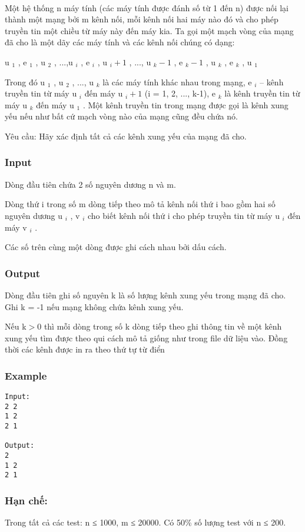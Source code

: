 

 

Một hệ thống n máy tính (các máy tính được đánh số từ 1 đến n) được nối lại thành một mạng bởi m kênh nối, mỗi kênh nối hai máy nào đó và cho phép truyền tin một chiều từ máy này đến máy kia. Ta gọi một mạch vòng của mạng đã cho là một dãy các máy tính và các kênh nối chúng có dạng:

u $_ 1 $ , e $_ 1 $ , u $_ 2 $ , ...,u $_ i $ , e $_ i $ , u $_ i+1 $ , ..., u $_ k-1 $ , e $_ k-1 $ , u $_ k $ , e $_ k $ , u $_ 1 $

Trong đó u $_ 1 $ , u $_ 2 $ , ..., u $_ k $ là các máy tính khác nhau trong mạng, e $_ i $ – kênh truyền tin từ máy u $_ i $ đến máy u $_ i+1 $ (i = 1, 2, ..., k-1), e $_ k $ là kênh truyền tin từ máy u $_ k $ đến máy u $_ 1 $ . Một kênh truyền tin trong mạng được gọi là kênh xung yếu nếu như bất cứ mạch vòng nào của mạng cũng đều chứa nó.

Yêu cầu: Hãy xác định tất cả các kênh xung yếu của mạng đã cho.

\subsubsection{Input}

Dòng đầu tiên chứa 2 số nguyên dương n và m.

Dòng thứ i trong số m dòng tiếp theo mô tả kênh nối thứ i bao gồm hai số nguyên dương u­ $_ i $ , v $_ i $ cho biết kênh nối thứ i cho phép truyền tin từ máy u $_ i $ đến máy v $_ i $ .

Các số trên cùng một dòng được ghi cách nhau bởi dấu cách.

\subsubsection{Output}

Dòng đầu tiên ghi số nguyên k là số lượng kênh xung yếu trong mạng đã cho. Ghi k = -1 nếu mạng không chứa kênh xung yếu.

Nếu k$>$0 thì mỗi dòng trong số k dòng tiếp theo ghi thông tin về một kênh xung yếu tìm được theo qui cách mô tả giống như trong file dữ liệu vào. Đồng thời các kênh được in ra theo thứ tự từ điển

\subsubsection{Example}
\begin{verbatim}
Input:
2 2
1 2
2 1

Output:
2
1 2
2 1

\end{verbatim}

\subsubsection{Hạn chế:}

Trong tất cả các test: n ≤ 1000, m ≤ 20000. Có 50\% số lượng test với n ≤ 200.